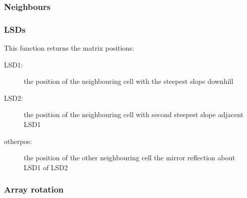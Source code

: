 \begin{usessubs}
\end{usessubs}

\subsubsection{Neighbours}



\subsubsection{LSDs}


This function returns the matrix positions:

\vspace{-2mm}
\begin{description}
\item [{LSD1:}] the position of the neighbouring cell with the steepest
slope downhill
\item [{LSD2:}] the position of the neighbouring cell with second steepest
slope adjacent LSD1
\item [{otherpos:}] the position of the other neighbouring cell the mirror
reflection about LSD1 of LSD2
\end{description}


\begin{usessubs}
\end{usessubs}

\subsubsection{Array rotation}




